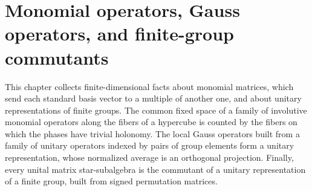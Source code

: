 \chapter{Monomial operators, Gauss operators, and finite-group commutants}
\label{ch:monomial_operators}

This chapter collects finite-dimensional facts about monomial matrices, which
send each standard basis vector to a multiple of another one, and about
unitary representations of finite groups. The common fixed space of a family
of involutive monomial operators along the fibers of a hypercube is counted
by the fibers on which the phases have trivial holonomy. The local Gauss
operators built from a family of unitary operators indexed by pairs of group
elements form a unitary representation, whose normalized average is an
orthogonal projection. Finally, every unital matrix star-subalgebra is the
commutant of a unitary representation of a finite group, built from signed
permutation matrices.




